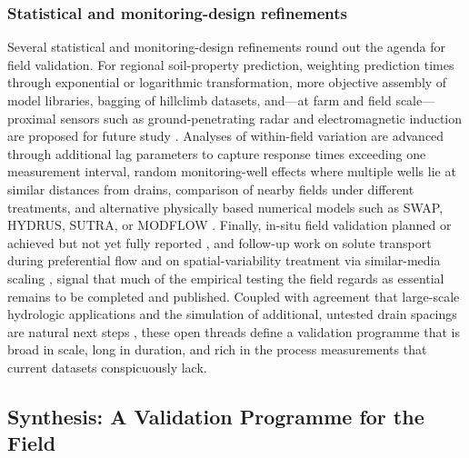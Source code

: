 \documentclass[11pt]{article}
\begin{document}
\subsubsection{Statistical and monitoring-design refinements}

Several statistical and monitoring-design refinements round out the agenda for field validation. For regional soil-property prediction, weighting prediction times through exponential or logarithmic transformation, more objective assembly of model libraries, bagging of hillclimb datasets, and---at farm and field scale---proximal sensors such as ground-penetrating radar and electromagnetic induction are proposed for future study \parencite{Moller2018}. Analyses of within-field variation are advanced through additional lag parameters to capture response times exceeding one measurement interval, random monitoring-well effects where multiple wells lie at similar distances from drains, comparison of nearby fields under different treatments, and alternative physically based numerical models such as SWAP, HYDRUS, SUTRA, or MODFLOW \parencite{vandeCraats2025}. Finally, in-situ field validation planned or achieved but not yet fully reported \parencite{Hartani2001}, and follow-up work on solute transport during preferential flow and on spatial-variability treatment via similar-media scaling \parencite{Mohanty1997}, signal that much of the empirical testing the field regards as essential remains to be completed and published. Coupled with agreement that large-scale hydrologic applications and the simulation of additional, untested drain spacings are natural next steps \parencite{Talukolaee2022}, these open threads define a validation programme that is broad in scale, long in duration, and rich in the process measurements that current datasets conspicuously lack.

\subsection{Synthesis: A Validation Programme for the Field}
\end{document}

